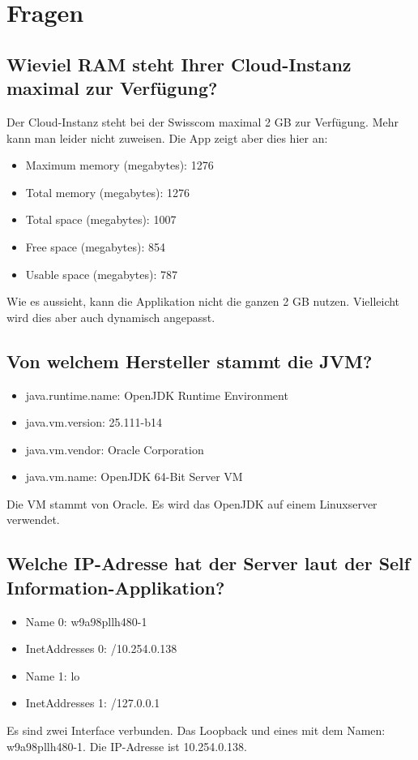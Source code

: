 \section{Fragen}
\subsection{Wieviel RAM steht Ihrer Cloud-Instanz maximal zur Verfügung?}
Der Cloud-Instanz steht bei der Swisscom maximal 2 GB zur Verfügung. Mehr kann man leider nicht zuweisen.
Die App zeigt aber dies hier an:
\begin{itemize}
\item		Maximum memory (megabytes): 1276
\item		Total memory (megabytes): 1276
\item		Total space (megabytes): 1007
\item		Free space (megabytes): 854
\item		Usable space (megabytes): 787
\end{itemize}
Wie es aussieht, kann die Applikation nicht die ganzen 2 GB nutzen. Vielleicht wird dies aber auch dynamisch angepasst.
\subsection{Von welchem Hersteller stammt die JVM?}
\begin{itemize}
\item		java.runtime.name: OpenJDK Runtime Environment
\item		java.vm.version: 25.111-b14
\item		java.vm.vendor: Oracle Corporation
\item		java.vm.name: OpenJDK 64-Bit Server VM
\end{itemize}
Die VM stammt von Oracle. Es wird das OpenJDK auf einem Linuxserver verwendet.
\subsection{Welche IP-Adresse hat der Server laut der Self Information-Applikation?}
\begin{itemize}
\item		Name 0: w9a98pllh480-1
\item		InetAddresses 0: /10.254.0.138
\item		Name 1: lo
\item		InetAddresses 1: /127.0.0.1
\end{itemize}
Es sind zwei Interface verbunden. Das Loopback und eines mit dem Namen: w9a98pllh480-1. Die IP-Adresse ist 10.254.0.138. 
